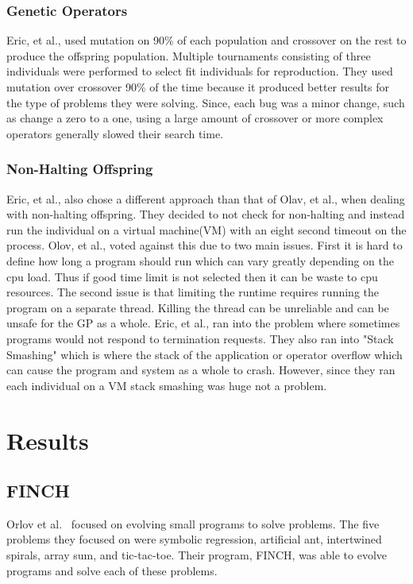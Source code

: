 \documentclass{sig-alternate}
\begin{document}
  

\subsubsection{Genetic Operators}
Eric, et al., used mutation on 90\% of each population and crossover on the rest to produce the offspring population. Multiple tournaments consisting of three individuals were performed to select fit individuals for reproduction. They used mutation over crossover 90\% of the time because it produced better results for the type of problems they were solving. Since, each bug was a minor change, such as change a zero to a one, using a large amount of crossover or more complex operators generally slowed their search time.  

\subsubsection{Non-Halting Offspring}

Eric, et al., also chose a different approach than that of Olav, et al., when dealing with non-halting offspring. They decided to not check for non-halting and instead run the individual on a virtual machine(VM) with an eight second timeout on the process. Olov, et al., voted against this due to two main issues. First it is hard to define how long a program should run which can vary greatly depending on the cpu load. Thus if good time limit is not selected then it can be waste to cpu resources. The second issue is that limiting the runtime requires running the program on a separate thread. Killing the thread can be unreliable and can be unsafe for the GP as a whole. Eric, et al., ran into the problem where sometimes programs would not respond to termination requests.
They also ran into "Stack Smashing" which is where the stack of the application or operator overflow which can cause the program and system as a whole to crash. However, since they ran each individual on a VM stack smashing was huge not a problem.  




\section{Results}
\subsection{FINCH}
Orlov et al.~\cite{FINCH:2011} focused on evolving small programs to solve problems. The five problems they focused on were symbolic regression, artificial ant, intertwined spirals, array sum, and tic-tac-toe. Their program, FINCH, was able to evolve programs and solve each of these problems.
\end{document}
